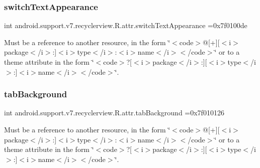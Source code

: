 \subsubsection{\texorpdfstring{switch\+Text\+Appearance}{switchTextAppearance}}
{\footnotesize\ttfamily int android.\+support.\+v7.\+recyclerview.\+R.\+attr.\+switch\+Text\+Appearance =0x7f0100de\hspace{0.3cm}{\ttfamily [static]}}

Must be a reference to another resource, in the form \char`\"{}$<$code$>$@\mbox{[}+\mbox{]}\mbox{[}$<$i$>$package$<$/i$>$\+:\mbox{]}$<$i$>$type$<$/i$>$\+:$<$i$>$name$<$/i$>$$<$/code$>$\char`\"{} or to a theme attribute in the form \char`\"{}$<$code$>$?\mbox{[}$<$i$>$package$<$/i$>$\+:\mbox{]}\mbox{[}$<$i$>$type$<$/i$>$\+:\mbox{]}$<$i$>$name$<$/i$>$$<$/code$>$\char`\"{}. \mbox{\label{classandroid_1_1support_1_1v7_1_1recyclerview_1_1R_1_1attr_a9e65dd5706c9d76494f42ccf6e532bd8}} 
\subsubsection{\texorpdfstring{tab\+Background}{tabBackground}}
{\footnotesize\ttfamily int android.\+support.\+v7.\+recyclerview.\+R.\+attr.\+tab\+Background =0x7f010126\hspace{0.3cm}{\ttfamily [static]}}

Must be a reference to another resource, in the form \char`\"{}$<$code$>$@\mbox{[}+\mbox{]}\mbox{[}$<$i$>$package$<$/i$>$\+:\mbox{]}$<$i$>$type$<$/i$>$\+:$<$i$>$name$<$/i$>$$<$/code$>$\char`\"{} or to a theme attribute in the form \char`\"{}$<$code$>$?\mbox{[}$<$i$>$package$<$/i$>$\+:\mbox{]}\mbox{[}$<$i$>$type$<$/i$>$\+:\mbox{]}$<$i$>$name$<$/i$>$$<$/code$>$\char`\"{}. \mbox{\label{classandroid_1_1support_1_1v7_1_1recyclerview_1_1R_1_1attr_afeab3ba486a1ddbf62801fbf94264b25}} 

